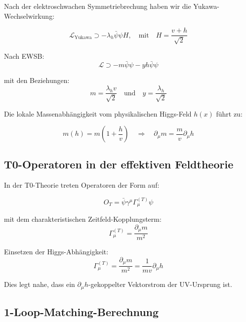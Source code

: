 Nach der elektroschwachen Symmetriebrechung haben wir die Yukawa-Wechselwirkung:

\begin{equation}
	\mathcal{L}_{\text{Yukawa}} \supset -\lambda_h \bar{\psi}\psi H, \quad \text{mit} \quad H = \frac{v + h}{\sqrt{2}}
\end{equation}

Nach EWSB:
\begin{equation}
	\mathcal{L} \supset -m \bar{\psi}\psi - y h \bar{\psi}\psi
\end{equation}

mit den Beziehungen:
\begin{equation}
	m = \frac{\lambda_h v}{\sqrt{2}} \quad \text{und} \quad y = \frac{\lambda_h}{\sqrt{2}}
\end{equation}

Die lokale Massenabhängigkeit vom physikalischen Higgs-Feld $h(x)$ führt zu:

\begin{equation}
	m(h) = m\left(1 + \frac{h}{v}\right) \quad \Rightarrow \quad \partial_\mu m = \frac{m}{v}\partial_\mu h
\end{equation}

\subsection{T0-Operatoren in der effektiven Feldtheorie}
\label{subsec:t0_operators}

In der T0-Theorie treten Operatoren der Form auf:

\begin{equation}
	O_T = \bar{\psi}\gamma^\mu\Gamma_\mu^{(T)}\psi
\end{equation}

mit dem charakteristischen Zeitfeld-Kopplungsterm:
\begin{equation}
	\Gamma_\mu^{(T)} = \frac{\partial_\mu m}{m^2}
\end{equation}

Einsetzen der Higgs-Abhängigkeit:
\begin{equation}
	\Gamma_\mu^{(T)} = \frac{\partial_\mu m}{m^2} = \frac{1}{mv}\partial_\mu h
\end{equation}

Dies legt nahe, dass ein $\partial_\mu h$-gekoppelter Vektorstrom der UV-Ursprung ist.

\subsection{1-Loop-Matching-Berechnung}
\label{subsec:one_loop_matching}

